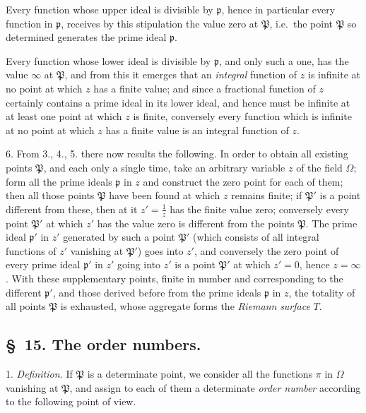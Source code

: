 \documentclass{article}
\begin{document}

Every function whose upper ideal is divisible by $\mathfrak{p}$, hence in particular every function in $\mathfrak{p}$, receives by this stipulation the value zero at $\mathfrak{P}$, i.e.\ the point $\mathfrak{P}$ so determined generates the prime ideal $\mathfrak{p}$.

Every function whose lower ideal is divisible by $\mathfrak{p}$, and only such a one, has the value $\infty$ at $\mathfrak{P}$, and from this it emerges that an \emph{integral} function of $z$ is infinite at no point at which $z$ has a finite value; and since a fractional function of $z$ certainly contains a prime ideal in its lower ideal, and hence must be infinite at at least one point at which $z$ is finite, conversely every function which is infinite at no point at which $z$ has a finite value is an integral function of $z$.

6. From 3., 4., 5. there now results the following. In order to obtain all existing points $\mathfrak{P}$, and each only a single time, take an arbitrary variable $z$ of the field $\Omega$; form all the prime ideals $\mathfrak{p}$ in $z$ and construct the zero point for each of them; then all those points $\mathfrak{P}$ have been found at which $z$ remains finite; if $\mathfrak{P}'$ is a point different from these, then at it $z' = \frac{1}{z}$ has the finite value zero; conversely every point $\mathfrak{P}'$ at which $z'$ has the value zero is different from the points $\mathfrak{P}$. The prime ideal $\mathfrak{p}'$ in $z'$ generated by such a point $\mathfrak{P}'$ (which consists of all integral functions of $z'$ vanishing at $\mathfrak{P}'$) goes into $z'$, and conversely the zero point of every prime ideal $\mathfrak{p}'$ in $z'$ going into $z'$ is a point $\mathfrak{P}'$ at which $z' = 0$, hence $z = \infty$. With these supplementary points, finite in number and corresponding to the different $\mathfrak{p}'$, and those derived before from the prime ideals $\mathfrak{p}$ in $z$, the totality of all points $\mathfrak{P}$ is exhausted, whose aggregate forms the \emph{Riemann} \emph{surface} $T$.

\subsection*{§~15. The order numbers.}

1. \emph{Definition.} If $\mathfrak{P}$ is a determinate point, we consider all the functions $\pi$ in $\Omega$ vanishing at $\mathfrak{P}$, and assign to each of them a determinate \emph{order number} according to the following point of view.
\end{document}
